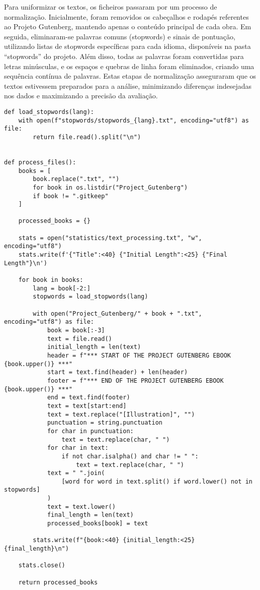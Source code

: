 \documentclass[shortpaper, portugues, times, mirror]{revdetua}
\begin{document}
Para uniformizar os textos, os ficheiros passaram por um processo de normalização. Inicialmente, foram removidos os cabeçalhos e rodapés referentes ao Projeto Gutenberg, mantendo apenas o conteúdo principal de cada obra. Em seguida, eliminaram-se palavras comuns (stopwords) e sinais de pontuação, utilizando listas de stopwords específicas para cada idioma, disponíveis na pasta “stopwords” do projeto. Além disso, todas as palavras foram convertidas para letras minúsculas, e os espaços e quebras de linha foram eliminados, criando uma sequência contínua de palavras. Estas etapas de normalização asseguraram que os textos estivessem preparados para a análise, minimizando diferenças indesejadas nos dados e maximizando a precisão da avaliação.
\begin{lstlisting}
def load_stopwords(lang):
    with open(f"stopwords/stopwords_{lang}.txt", encoding="utf8") as file:
        return file.read().split("\n")


def process_files():
    books = [
        book.replace(".txt", "")
        for book in os.listdir("Project_Gutenberg")
        if book != ".gitkeep"
    ]

    processed_books = {}

    stats = open("statistics/text_processing.txt", "w", encoding="utf8")
    stats.write(f'{"Title":<40} {"Initial Length":<25} {"Final Length"}\n')

    for book in books:
        lang = book[-2:]
        stopwords = load_stopwords(lang)

        with open("Project_Gutenberg/" + book + ".txt", encoding="utf8") as file:
            book = book[:-3]
            text = file.read()
            initial_length = len(text)
            header = f"*** START OF THE PROJECT GUTENBERG EBOOK {book.upper()} ***"
            start = text.find(header) + len(header)
            footer = f"*** END OF THE PROJECT GUTENBERG EBOOK {book.upper()} ***"
            end = text.find(footer)
            text = text[start:end]
            text = text.replace("[Illustration]", "")
            punctuation = string.punctuation
            for char in punctuation:
                text = text.replace(char, " ")
            for char in text:
                if not char.isalpha() and char != " ":
                    text = text.replace(char, " ")
            text = " ".join(
                [word for word in text.split() if word.lower() not in stopwords]
            )
            text = text.lower()
            final_length = len(text)
            processed_books[book] = text

        stats.write(f"{book:<40} {initial_length:<25} {final_length}\n")

    stats.close()

    return processed_books
\end{lstlisting}
\end{document}
